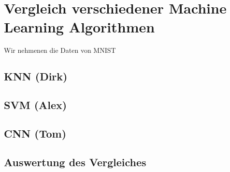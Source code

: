 \section{Vergleich verschiedener Machine Learning Algorithmen}
Wir nehmenen die Daten von MNIST
\subsection{KNN (Dirk)}

\subsection{SVM (Alex)}

\subsection{CNN (Tom)}

\subsection{Auswertung des Vergleiches}
